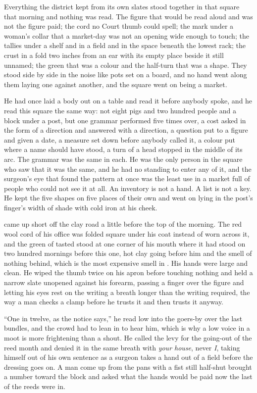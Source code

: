 Everything the district kept from its own slates stood together in that square that morning and nothing was read. The figure that would be read aloud and was not the figure paid; the cord no Court thumb could spell; the mark under a woman's collar that a market-day was not an opening wide enough to touch; the tallies under a shelf and in a field and in the space beneath the lowest rack; the crust in a fold two inches from an ear with its empty place beside it still unnamed; the green that was a colour and the half-turn that was a shape. They stood side by side in the noise like pots set on a board, and no hand went along them laying one against another, and the square went on being a market.

He had once laid a body out on a table and read it before anybody spoke, and he read this square the same way: not eight pigs and two hundred people and a block under a post, but one grammar performed five times over, a cost asked in the form of a direction and answered with a direction, a question put to a figure and given a date, a measure set down before anybody called it, a colour put where a name should have stood, a turn of a head stopped in the middle of its arc. The grammar was the same in each. He was the only person in the square who saw that it was the same, and he had no standing to enter any of it, and the surgeon's eye that found the pattern at once was the least use in a market full of people who could not see it at all. An inventory is not a hand. A list is not a key. He kept the five shapes on five places of their own and went on lying in the post's finger's width of shade with cold iron at his cheek.

 came up short off the clay road a little before the top of the morning. The red wool cord of his office was folded square under his coat instead of worn across it, and the green of tasted  stood at one corner of his mouth where it had stood on two hundred mornings before this one, hot clay going before him and the smell of nothing behind, which is the most expensive smell in . His hands were large and clean. He wiped the thumb twice on his apron before touching nothing and held a narrow slate unopened against his forearm, passing a finger over the figure and letting his eyes rest on the writing a breath longer than the writing required, the way a man checks a clamp before he trusts it and then trusts it anyway.

“One in twelve, as the notice says,” he read low into the goers-by over the last bundles, and the crowd had to lean in to hear him, which is why a low voice in a moot is more frightening than a shout. He called the levy for the going-out of the reed month and denied it in the same breath with \emph{your house}, never \emph{I}, taking himself out of his own sentence as a surgeon takes a hand out of a field before the dressing goes on. A man come up from the pans with a fist still half-shut brought a number toward the block and asked what the hands would be paid now the last of the reeds were in.

